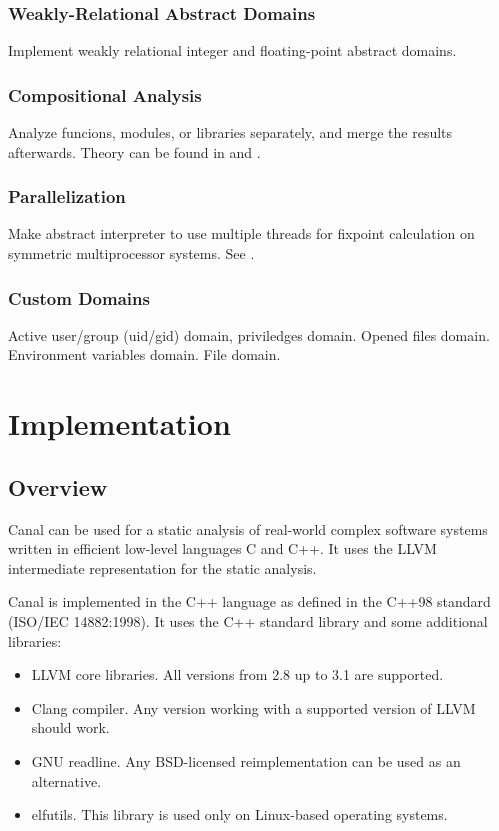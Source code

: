 \documentclass[a4paper]{book}
\begin{document}
\section{Weakly-Relational Abstract Domains}
Implement weakly relational integer and floating-point abstract
domains.

\section{Compositional Analysis}
Analyze funcions, modules, or libraries separately, and merge the
results afterwards.  Theory can be found in \cite{CC01} and
\cite{CC02}.

\section{Parallelization}
Make abstract interpreter to use multiple threads for fixpoint
calculation on symmetric multiprocessor systems.  See \cite{M05}.

\section{Custom Domains}
Active user/group (uid/gid) domain, priviledges domain.  Opened files
domain.  Environment variables domain.  File domain.

\part{Implementation}

\chapter{Overview}

Canal can be used for a static analysis of real-world complex software
systems written in efficient low-level languages C and C++.  It uses
the LLVM intermediate representation for the static analysis.

Canal is implemented in the C++ language as defined in the C++98
standard (ISO/IEC 14882:1998).  It uses the C++ standard library and
some additional libraries:
\begin{itemize}
\item LLVM core libraries.  All versions from 2.8 up to 3.1 are
  supported.
\item Clang compiler.  Any version working with a supported version of
  LLVM should work.
\item GNU readline.  Any BSD-licensed reimplementation can be used as
  an alternative.
\item elfutils.  This library is used only on Linux-based operating
  systems.
\end{itemize}
\end{document}
